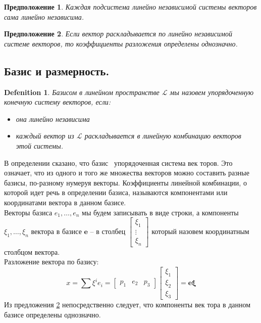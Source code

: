 \documentclass[11pt; a4paper]{report}
\theoremstyle{plain} %
\newtheorem{sug}{Предположение}[section]
\theoremstyle{defenition}
\newtheorem{glob_def}{Defenition}
\theoremstyle{remark}
\begin{document}
\begin{sug}\label{sug6.4}
Каждая подсистема линейно независимой системы векторов сама линейно независима.\\
\end{sug}

\begin{sug}\label{sug6.5}
Если вектор раскладывается по линейно неза­висимой системе векторов, то коэффициенты разложения определены однозначно.\\
\end{sug}

\subsection{Базис и размерность.}
\begin{glob_def}
Базисом в линейном пространстве $\mathscr{L}$  мы назо­вем упорядоченную конечную систему векторов, если:
\begin{itemize}
\item она линейно независима
\item каждый вектор из $\mathscr{L}$   раскладывается в линейную комбинацию векторов этой системы.
\end{itemize}
\end{glob_def}

В определении сказано, что базис \textemdash\  упорядоченная система век­ торов. Это означает,
 что из одного и того же множества векторов можно составить разные базисы, по-разному нумеруя векторы.
Коэффициенты линейной комбинации, о которой идет речь
в определении базиса, называются компонентами или координатами вектора в данном базисе.\\
Векторы базиса $e_1, \ldots, e_n$ мы будем записывать в виде строки, 
а компоненты $\xi_1, \ldots, \xi_n$ вектора в базисе $\boldsymbol{e}$ -- в столбец $\begin{bmatrix} \xi_1 \\  \vdots \\ \xi_n \end{bmatrix}$ который назовем координатным столбцом вектора.\\
Разложение вектора по  базису:
 \begin{equation*}
 x = \sum \xi^ie_i =  \begin{bmatrix} p_1 &  e_2 & p_3 \end{bmatrix}  
 \begin{bmatrix} \xi_1 \\  \xi_2 \\ \xi_3 \end{bmatrix} = \boldsymbol{ e\xi}
 \end{equation*}
Из предложения \ref{sug6.5} непосредственно следует, что компоненты век­ тора в данном базисе определены однозначно.
\end{document}
